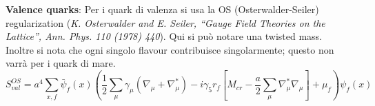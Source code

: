 \documentclass[12pt,a4paper,openright]{article}
\begin{document}
\newline
\newline
{\bf Valence quarks}:\newline
Per i quark di valenza si usa la OS (Osterwalder-Seiler) regularization (\textit{K. Osterwalder and E. Seiler, “Gauge Field Theories on the Lattice”, Ann. Phys. 110 (1978) 440}).
Qui si può notare una twisted mass.
Inoltre si nota che ogni singolo flavour contribuisce singolarmente; questo non varrà per i quark di mare.
\begin{equation}\label{eqn:OS}
  S_{val}^{OS} = a^4 \sum_{x,f} \bar \psi_f(x)\left( \frac{1}{2}\sum_\mu \gamma_\mu (\nabla_\mu + \nabla_\mu ^*) - i \gamma_5 r_{f} [ M_{cr} - \frac{a}{2}\sum_\mu \nabla_\mu^* \nabla_\mu ] + \mu_{f} \right) \psi_f (x) 
\end{equation}
\end{document}
